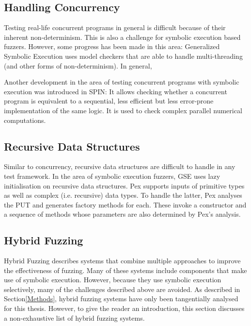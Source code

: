 \documentclass{article}
\begin{document}
\begin{multicols}{2}
    \subsection{Handling Concurrency}
    Testing real-life concurrent programs in general is difficult because of their inherent non-determinism. This is also a challenge for symbolic execution based fuzzers. However, some progress has been made in this area: Generalized Symbolic Execution\cite{GSE} uses model checkers that are able to handle multi-threading (and other forms of non-determinism). In general, \cite{ReviewThreeDecades}

    Another development in the area of testing concurrent programs with symbolic execution was introduced in SPIN\cite{SPIN}: It allows checking whether a concurrent program is equivalent to a sequential, less efficient but less error-prone implementation of the same logic. It is used to check complex parallel numerical computations.

    \subsection{Recursive Data Structures}
    Similar to concurrency, recursive data structures are difficult to handle in any test framework. In the area of symbolic execution fuzzers, GSE\cite{GSE} uses lazy initialisation on recursive data structures. Pex\cite{Pex} supports inputs of primitive types as well as complex (i.e. recursive) data types. To handle the latter, Pex analyses the PUT and generates factory methods for each. These invoke a constructor and a sequence of methods whose parameters are also determined by Pex's analysis.

    \subsection{Hybrid Fuzzing}
    \label{HybridFuzzing}
    Hybrid Fuzzing describes systems that combine multiple approaches to improve the effectiveness of fuzzing. Many of these systems include components that make use of symbolic execution. However, because they use symbolic execution selectively, many of the challenges described above are avoided. As described in Section\ref{Methods}, hybrid fuzzing systems have only been tangentially analysed for this thesis. However, to give the reader an introduction, this section discusses a non-exhaustive list of hybrid fuzzing systems.


\end{multicols}
\end{document}

